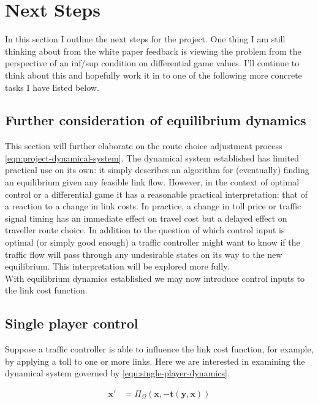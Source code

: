 \section{Next Steps}

In this section I outline the next steps for the project.
One thing I am still thinking about from the white paper feedback is viewing the problem from the perspective of an inf/sup condition on differential game values.
I'll continue to think about this and hopefully work it in to one of the following more concrete tasks I have listed below.

\subsection{Further consideration of equilibrium dynamics}

This section will further elaborate on the route choice adjustment process \eqref{eqn:project-dynamical-system}.
The dynamical system established has limited practical use on its own: it simply describes an algorithm for (eventually) finding an equilibrium given any feasible link flow.
However, in the context of optimal control or a differential game it has a reasonable practical interpretation: that of a reaction to a change in link costs. 
In practice, a change in toll price or traffic signal timing has an immediate effect on travel cost but a delayed effect on traveller route choice.
In addition to the question of which control input is optimal (or simply good enough) a traffic controller might want to know if the traffic flow will pass through any undesirable states on its way to the new equilibrium.
This interpretation will be explored more fully.\\

With equilibrium dynamics established we may now introduce control inputs to the link cost function.

\subsection{Single player control}

Suppose a traffic controller is able to influence the link cost function, for example, by applying a toll to one or more links.
Here we are interested in examining the dynamical system governed by \eqref{eqn:single-player-dynamics}. 

\begin{align}
    \mathbf{x}' &= \Pi_{\Omega} (\mathbf{x}, -\mathbf{t}(\mathbf{y}, \mathbf{x}))\label{eqn:single-player-dynamics}
\end{align}

